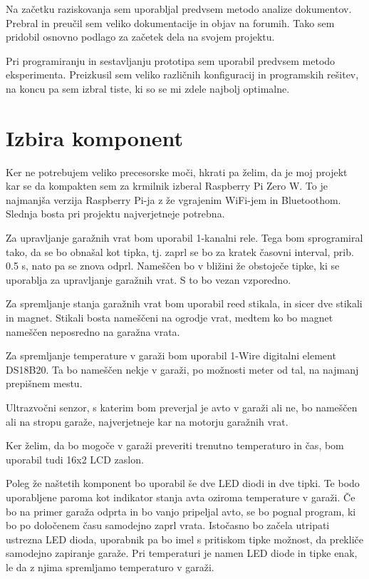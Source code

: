 \documentclass[11pt]{article}
\begin{document}
Na začetku raziskovanja sem uporabljal predvsem metodo analize dokumentov. Prebral in preučil sem veliko dokumentacije in objav na forumih. Tako sem pridobil osnovno podlago za začetek dela na svojem projektu.

Pri programiranju in sestavljanju prototipa sem uporabil predvsem metodo eksperimenta. Preizkusil sem veliko različnih konfiguracij in programskih rešitev, na koncu pa sem izbral tiste, ki so se mi zdele najbolj optimalne.
\newpage

\section{Izbira komponent}
  Ker ne potrebujem veliko precesorske moči, hkrati pa želim, da je moj projekt kar se da kompakten sem za krmilnik izberal Raspberry Pi Zero W. To je najmanjša verzija Raspberry Pi-ja z že vgrajenim WiFi-jem in Bluetoothom. Slednja bosta pri projektu najverjetneje potrebna.

  Za upravljanje garažnih vrat bom uporabil 1-kanalni rele. Tega bom sprogramiral tako, da se bo obnašal kot tipka, tj. zaprl se bo za kratek časovni interval, prib. 0.5 s, nato pa se znova odprl. Nameščen bo v bližini že obstoječe tipke, ki se uporablja za upravljanje garažnih vrat. S to bo vezan vzporedno.

  Za spremljanje stanja garažnih vrat bom uporabil reed stikala, in sicer dve stikali in magnet. Stikali bosta nameščeni na ogrodje vrat, medtem ko bo magnet nameščen neposredno na garažna vrata.

  Za spremljanje temperature v garaži bom uporabil 1-Wire digitalni element DS18B20. Ta bo nameščen nekje v garaži, po možnosti meter od tal, na najmanj prepišnem mestu.

  Ultrazvočni senzor, s katerim bom preverjal je avto v garaži ali ne, bo nameščen ali na stropu garaže, najverjetneje kar na motorju garažnih vrat.

  Ker želim, da bo mogoče v garaži preveriti trenutno temperaturo in čas, bom uporabil tudi 16x2 LCD zaslon.

  Poleg že naštetih komponent bo uporabil še dve LED diodi in dve tipki. Te bodo uporabljene paroma kot indikator stanja avta oziroma temperature v garaži. Če bo na primer garaža odprta in bo vanjo pripeljal avto, se bo pognal program, ki bo po določenem času samodejno zaprl vrata. Istočasno bo začela utripati ustrezna LED dioda, uporabnik pa bo imel s pritiskom tipke možnost, da prekliče samodejno zapiranje garaže. Pri temperaturi je namen LED diode in tipke enak, le da z njima spremljamo temperaturo v garaži.
\end{document}
